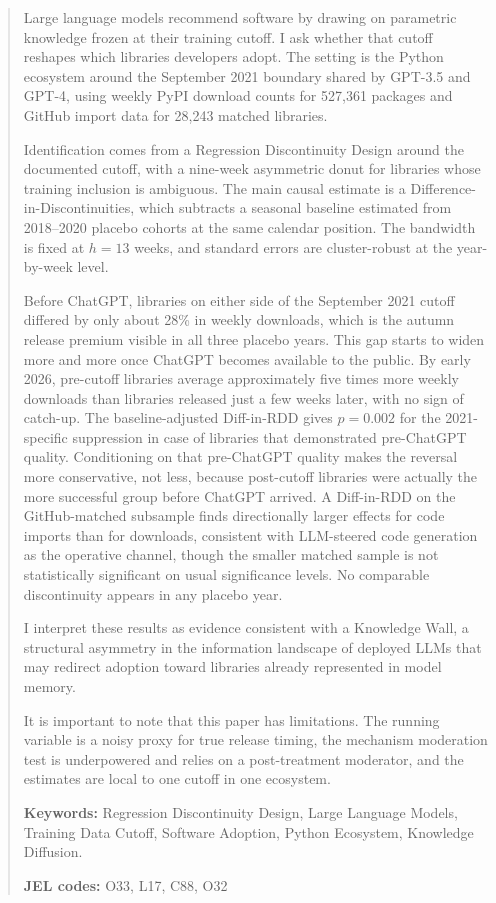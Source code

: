 \documentclass[12pt, a4paper]{report}
\begin{document}
\begin{abstract}
\noindent
Large language models recommend software by drawing on parametric knowledge frozen at their training cutoff. I ask whether that cutoff reshapes which libraries developers adopt. The setting is the Python ecosystem around the September 2021 boundary shared by GPT-3.5 and GPT-4, using weekly PyPI download counts for 527,361 packages and GitHub import data for 28,243 matched libraries.

Identification comes from a Regression Discontinuity Design around the documented cutoff, with a nine-week asymmetric donut for libraries whose training inclusion is ambiguous. The main causal estimate is a Difference-in-Discontinuities, which subtracts a seasonal baseline estimated from 2018--2020 placebo cohorts at the same calendar position. The bandwidth is fixed at $h = 13$ weeks, and standard errors are cluster-robust at the year-by-week level.

Before ChatGPT, libraries on either side of the September 2021 cutoff differed by only about 28\% in weekly downloads, which is the autumn release premium visible in all three placebo years. This gap starts to widen more and more once ChatGPT becomes available to the public. By early 2026, pre-cutoff libraries average approximately five times more weekly downloads than libraries released just a few weeks later, with no sign of catch-up. The baseline-adjusted Diff-in-RDD gives $p = 0.002$ for the 2021-specific suppression in case of libraries that demonstrated pre-ChatGPT quality. Conditioning on that pre-ChatGPT quality makes the reversal more conservative, not less, because post-cutoff libraries were actually the more successful group before ChatGPT arrived. A Diff-in-RDD on the GitHub-matched subsample finds directionally larger effects for code imports than for downloads, consistent with LLM-steered code generation as the operative channel, though the smaller matched sample is not statistically significant on usual significance levels. No comparable discontinuity appears in any placebo year.

I interpret these results as evidence consistent with a Knowledge Wall, a structural asymmetry in the information landscape of deployed LLMs that may redirect adoption toward libraries already represented in model memory.

It is important to note that this paper has limitations. The running variable is a noisy proxy for true release timing, the mechanism moderation test is underpowered and relies on a post-treatment moderator, and the estimates are local to one cutoff in one ecosystem.

\vspace{0.5cm}
\noindent \textbf{Keywords:} Regression Discontinuity Design, Large Language Models, Training Data Cutoff, Software Adoption, Python Ecosystem, Knowledge Diffusion.

\noindent \textbf{JEL codes:} O33, L17, C88, O32
\end{abstract}
\newpage
\end{document}
